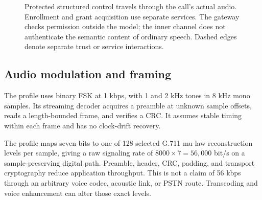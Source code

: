 \begin{figure}[t]
\centering
{}
\caption{Protected structured control travels through the call's actual audio. Enrollment and grant acquisition use separate services. The gateway checks permission outside the model; the inner channel does not authenticate the semantic content of ordinary speech. Dashed edges denote separate trust or service interactions.}
\label{fig:architecture}
\end{figure}

\subsection{Audio modulation and framing}
The  profile uses binary FSK at 1 kbps, with 1 and 2 kHz tones
in 8 kHz mono samples. Its streaming decoder acquires a preamble at unknown
sample offsets, reads a length-bounded frame, and verifies a CRC. It assumes
stable timing within each frame and has no clock-drift recovery.

The  profile maps seven bits to one of 128 selected G.711 mu-law
reconstruction levels per sample, giving a raw signaling rate of
$8000\times7=56{,}000$ bit/s on a sample-preserving digital path. Preamble,
header, CRC, padding, and transport cryptography reduce application throughput.
This is not a claim of 56 kbps through an arbitrary voice codec, acoustic link,
or PSTN route. Transcoding and voice enhancement can alter those exact levels.

